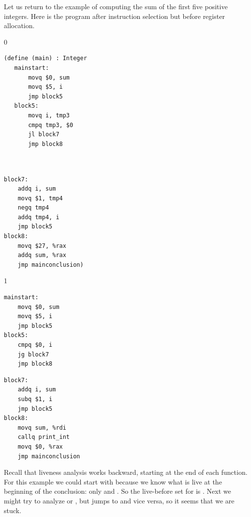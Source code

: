 \documentclass[7x10]{TimesAPriori_MIT}%
\def\racketEd{0}
\def\pythonEd{1}
\providecommand{\BookEdition}{1}
\let\edition\BookEdition
\newcommand{\pythonColor}[0]{}
\numberwithin{theorem}{chapter}
\numberwithin{definition}{chapter}
\numberwithin{equation}{chapter}
\begin{document}
Let us return to the example of computing the sum of the first five
positive integers. Here is the program after instruction
selection but before register
allocation.
\begin{center}
{\if\edition\racketEd    
  \begin{minipage}{0.45\textwidth}
\begin{lstlisting}
(define (main) : Integer
   mainstart:
       movq $0, sum
       movq $5, i
       jmp block5
   block5:
       movq i, tmp3
       cmpq tmp3, $0
       jl block7
       jmp block8
\end{lstlisting}
\end{minipage}
\begin{minipage}{0.45\textwidth}
  \begin{lstlisting}

    
block7:
    addq i, sum
    movq $1, tmp4
    negq tmp4
    addq tmp4, i
    jmp block5
block8:
    movq $27, %rax
    addq sum, %rax
    jmp mainconclusion)
\end{lstlisting}
  \end{minipage}
\fi}
{\if\edition\pythonEd\pythonColor
\begin{minipage}{0.45\textwidth}
\begin{lstlisting}
mainstart:
    movq $0, sum
    movq $5, i
    jmp block5
block5:
    cmpq $0, i
    jg block7
    jmp block8
\end{lstlisting}
\end{minipage}
\begin{minipage}{0.45\textwidth}
\begin{lstlisting}
block7:
    addq i, sum
    subq $1, i
    jmp block5
block8:
    movq sum, %rdi
    callq print_int
    movq $0, %rax
    jmp mainconclusion
\end{lstlisting}
  \end{minipage}
\fi}
\end{center}
Recall that liveness analysis works backward, starting at the end
of each function. For this example we could start with 
because we know what is live at the beginning of the conclusion:
only  and . So the live-before set
for  is .
%
Next we might try to analyze  or , but
 jumps to  and vice versa, so it seems that
we are stuck.
\end{document}
